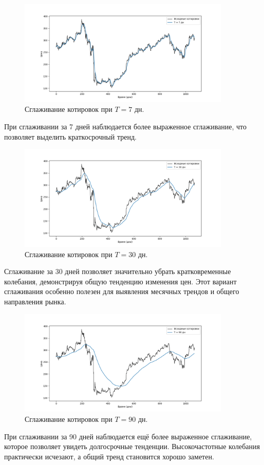 \documentclass[a4paper]{article}
\begin{document}
\begin{figure}[H]
  \centering
  \includegraphics[width=0.9\textwidth]{src/smooth_price_7.png}
  \caption{Сглаживание котировок при \(T=7\) дн.}
\end{figure}
\noindent При сглаживании за 7 дней наблюдается более выраженное сглаживание, что позволяет выделить краткосрочный тренд.

\begin{figure}[H]
  \centering
  \includegraphics[width=0.9\textwidth]{src/smooth_price_30.png}
  \caption{Сглаживание котировок при \(T=30\) дн.}
\end{figure}
\noindent Сглаживание за 30 дней позволяет значительно убрать кратковременные колебания, демонстрируя общую тенденцию изменения цен. Этот вариант сглаживания особенно полезен для выявления месячных трендов и общего направления рынка.

\begin{figure}[H]
  \centering
  \includegraphics[width=0.9\textwidth]{src/smooth_price_90.png}
  \caption{Сглаживание котировок при \(T=90\) дн.}
\end{figure}
\noindent При сглаживании за 90 дней наблюдается ещё более выраженное сглаживание, которое позволяет увидеть долгосрочные тенденции. Высокочастотные колебания практически исчезают, а общий тренд становится хорошо заметен.
\end{document}
